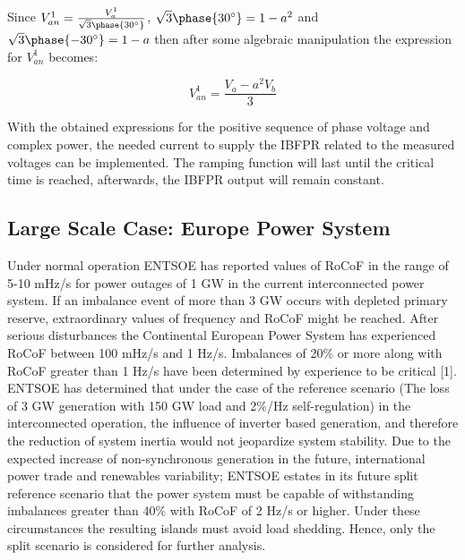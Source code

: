 Since $V_{an}^1=\frac{V_a^1}{\sqrt{3}\phase{30^{\circ}}}$, $\sqrt{3}\phase{30^{\circ}}=1-a^2 $ and $ \sqrt{3}\phase{-30^{\circ}}=1-a $ then after some algebraic manipulation the expression for $ V_{an}^1 $ becomes:

\begin{equation}
	V_{an}^1=\dfrac{V_a-a^2 V_b}{3}
\end{equation}

With the obtained expressions for the positive sequence of phase voltage and complex power, the needed current to supply the IBFPR related to the measured voltages can be implemented. The ramping function will last until the critical time is reached, afterwards, the IBFPR output will remain constant.

\subsection{Large Scale Case: Europe Power System}

Under normal operation ENTSOE has reported values of RoCoF in the range of 5-10 mHz/s for power outages of 1 GW in the current interconnected power system. If an imbalance event of more than 3 GW occurs with depleted primary reserve, extraordinary values of frequency and RoCoF might be reached. After serious disturbances the Continental European Power System has experienced RoCoF between 100 mHz/s and 1 Hz/s. Imbalances of 20\% or more along with RoCoF greater than 1 Hz/s have been determined by experience to be critical [1].
ENTSOE has determined that under the case of the reference scenario (The loss of 3 GW generation with 150 GW load and 2\%/Hz self-regulation) in the interconnected operation, the influence of inverter based generation, and therefore the reduction of system inertia would not jeopardize system stability. Due to the expected increase of non-synchronous generation in the future, international power trade and renewables variability; ENTSOE estates in its future split reference scenario that the power system must be capable of withstanding imbalances greater than 40\% with RoCoF of 2 Hz/s or higher. Under these circumstances the resulting islands must avoid load shedding. Hence, only the split scenario is considered for further analysis.

